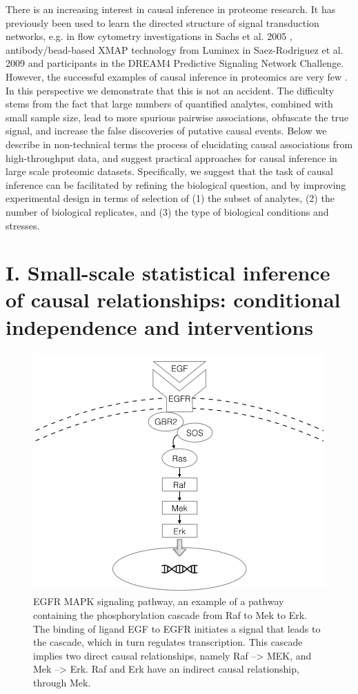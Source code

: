 \documentclass[journal=jacsat,manuscript=article]{achemso}
\def\added#1{{\color{blue} #1}}
\begin{document}
\added{There is an increasing interest in causal inference in proteome research. It has previously been used to learn the directed structure of signal transduction networks, e.g. in flow cytometry investigations in Sachs et al. 2005 \cite{sachs2013single}, antibody/bead-based XMAP technology from Luminex in Saez-Rodriguez et al. 2009\cite{saez2009discrete} and participants in the DREAM4 Predictive Signaling Network Challenge\cite{prill2011crowdsourcing}.
However, the successful examples of causal inference in proteomics are very few \cite{bensimon2012mass}. In this perspective we demonstrate that this is not an accident.  The difficulty stems from the fact that large numbers of quantified analytes, combined with small sample size, lead to more spurious pairwise associations, obfuscate the true signal, and increase the false discoveries of putative causal events. Below we describe in non-technical terms the process of elucidating causal associations from high-throughput data, and suggest practical approaches for causal inference in large scale proteomic datasets.  Specifically, we suggest that the task of causal inference can be facilitated by refining the biological question, and by improving experimental design in terms of selection of  (1) the subset of analytes, (2) the number of biological replicates, and (3) the type of biological conditions and stresses. }


\section{I. Small-scale statistical inference of causal relationships: conditional independence and interventions}

\begin{figure}[!tpb]
\centerline{\includegraphics[width=.5\textwidth]{figs/egfr.png}}
\caption{EGFR MAPK signaling pathway, an example of a pathway containing the phosphorylation cascade from Raf to Mek to Erk.  The binding of ligand EGF to EGFR initiates a signal that leads to the cascade, which in turn regulates transcription.  This cascade implies two direct causal relationships, namely Raf --> MEK, and Mek --> Erk.  Raf and Erk have an indirect causal relationship, through Mek.\label{mapk}}
\end{figure}
\end{document}
